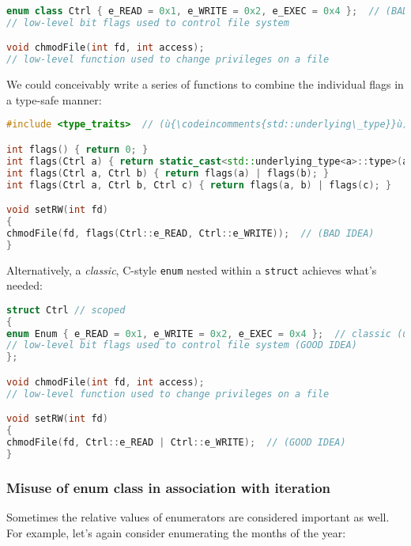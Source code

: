 \begin{lstlisting}[language=C++]
enum class Ctrl { e_READ = 0x1, e_WRITE = 0x2, e_EXEC = 0x4 };  // (BAD IDEA)
// low-level bit flags used to control file system

void chmodFile(int fd, int access);
// low-level function used to change privileges on a file
\end{lstlisting}

\noindent We could conceivably write a series of functions to combine the
individual flags in a type-safe manner:

\begin{lstlisting}[language=C++]
#include <type_traits>  // (ù{\codeincomments{std::underlying\_type}}ù)

int flags() { return 0; }
int flags(Ctrl a) { return static_cast<std::underlying_type<a>::type>(a); }
int flags(Ctrl a, Ctrl b) { return flags(a) | flags(b); }
int flags(Ctrl a, Ctrl b, Ctrl c) { return flags(a, b) | flags(c); }

void setRW(int fd)
{
chmodFile(fd, flags(Ctrl::e_READ, Ctrl::e_WRITE));  // (BAD IDEA)
}
\end{lstlisting}

\noindent Alternatively, a \emph{classic}, C-style \texttt{enum} nested within a
\texttt{struct} achieves what's needed:

\begin{lstlisting}[language=C++]
struct Ctrl // scoped
{
enum Enum { e_READ = 0x1, e_WRITE = 0x2, e_EXEC = 0x4 };  // classic (ù{\codeincomments{enum}}ù)
// low-level bit flags used to control file system (GOOD IDEA)
};

void chmodFile(int fd, int access);
// low-level function used to change privileges on a file

void setRW(int fd)
{
chmodFile(fd, Ctrl::e_READ | Ctrl::e_WRITE);  // (GOOD IDEA)
}
\end{lstlisting}


\subsubsection[Misuse of {\tt enum} {\tt class} in association with iteration]{Misuse of {\SubsubsecCode enum} {\SubsubsecCode class} in association with iteration}\label{misuse-of-enum-class-in-association-with-iteration}

Sometimes the relative values of enumerators are considered important as
well. For example, let's again consider enumerating the months of the
year:

